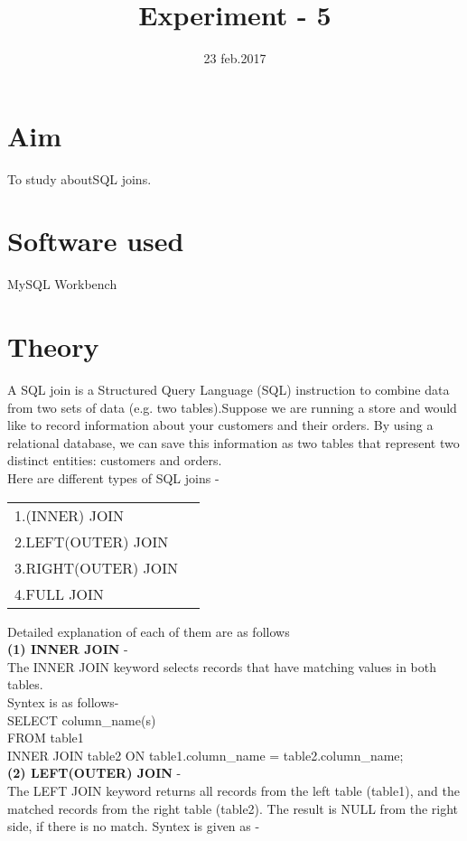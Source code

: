 \documentclass[100pt]{article}
\title{Experiment - 5} %
\date{23 feb.2017} %
\begin{document}
		\maketitle %
	\section{Aim}
    To study aboutSQL joins.
	\section{Software used}
	MySQL Workbench
	\section{Theory}
	A SQL join is a Structured Query Language (SQL) instruction to combine data from two sets of data (e.g. two tables).Suppose we are running a store and would like to record information about your customers and their orders. By using a relational database, we can save this information as two tables that represent two distinct entities: customers and orders.\\
	
	Here are different types of SQL joins - \\
	      	\begin{tabular}{l r}
	      1.(INNER) JOIN\\
	      2.LEFT(OUTER) JOIN\\
	      3.RIGHT(OUTER) JOIN\\
	      4.FULL JOIN\\
	       \end{tabular}
	Detailed explanation of each of them are as follows \\
	
   \textbf{(1) INNER JOIN} - \\
   The INNER JOIN keyword selects records that have matching values in both tables.\\
   Syntex is as follows-\\
   
         SELECT column_name(s)\\
         FROM table1\\
         INNER JOIN table2 ON table1.column_name = table2.column_name;\\
         
   \textbf{(2) LEFT(OUTER) JOIN} - \\
   The LEFT JOIN keyword returns all records from the left table (table1), and the matched records from the right table (table2). The result is NULL from the right side, if there is no match. Syntex is given as - \\
    
\end{document}

